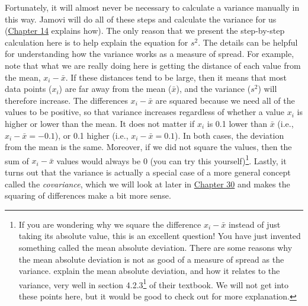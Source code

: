 \documentclass[
  openany]{krantz}
\renewcommand{\href}[2]{#2\footnote{\url{#1}}}
\begin{document}
Fortunately, it will almost never be necessary to calculate a variance manually in this way.
Jamovi will do all of these steps and calculate the variance for us (\protect\hyperlink{Chapter_14}{Chapter 14} explains how).
The only reason that we present the step-by-step calculation here is to help explain the equation for \(s^{2}\).
The details can be helpful for understanding how the variance works as a measure of spread.
For example, note that what we are really doing here is getting the distance of each value from the mean, \(x_{i} - \bar{x}\).
If these distances tend to be large, then it means that most data points (\(x_{i}\)) are far away from the mean (\(\bar{x}\)), and the variance (\(s^{2}\)) will therefore increase.
The differences \(x_{i} - \bar{x}\) are squared because we need all of the values to be positive, so that variance increases regardless of whether a value \(x_{i}\) is higher or lower than the mean.
It does not matter if \(x_{i}\) is 0.1 lower than \(\bar{x}\) (i.e., \(x_{i} - \bar{x} = -0.1\)), or 0.1 higher (i.e., \(x_{i} - \bar{x} = 0.1\)).
In both cases, the deviation from the mean is the same.
Moreover, if we did not square the values, then the sum of \(x_{i} - \bar{x}\) values would always be 0 (you can try this yourself)\footnote{If you are wondering why we square the difference \(x_{i} - \bar{x}\) instead of just taking its absolute value, this is an excellent question! You have just invented something called the mean absolute deviation. There are some reasons why the mean absolute deviation is not as good of a measure of spread as the variance. \citet{Navarro2022} explain the mean absolute deviation, and how it relates to the variance, very well in \href{https://davidfoxcroft.github.io/lsj-book/04-Descriptive-statistics.html\#mean-absolute-deviation}{section 4.2.3} of their textbook. We will not get into these points here, but it would be good to check out \citet{Navarro2022} for more explanation.}.
Lastly, it turns out that the variance is actually a special case of a more general concept called the \emph{covariance}, which we will look at later in \protect\hyperlink{Chapter_30}{Chapter 30} and makes the squaring of differences make a bit more sense.
\end{document}
